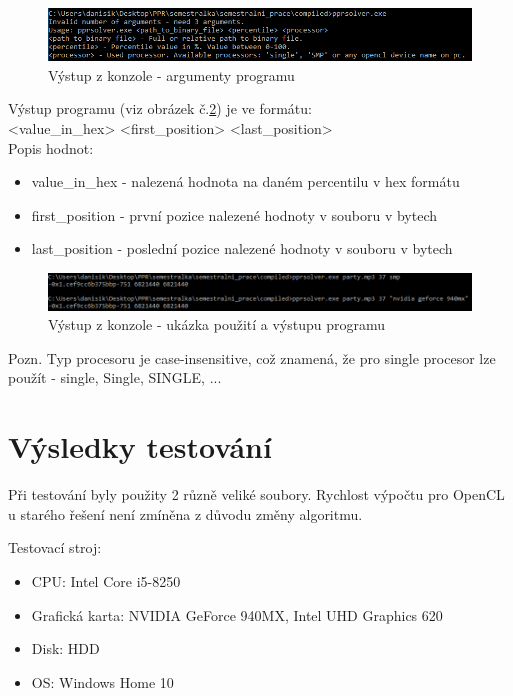 \documentclass[12pt, a4paper]{article}
\begin{document}
\begin{figure}[h!]
\centering
\includegraphics[width=16cm]{img/console_invalid}
\caption{Výstup z konzole - argumenty programu}
\label{fig:arguments}
\end{figure}

\noindent Výstup programu (viz obrázek č.\ref{fig:output}) je ve formátu:\\

\noindent <value\_in\_hex> <first\_position> <last\_position>\\

\noindent Popis hodnot:
\begin{itemize}
\item value\_in\_hex - nalezená hodnota na daném percentilu v hex formátu
\item first\_position - první pozice nalezené hodnoty v souboru v bytech
\item last\_position - poslední pozice nalezené hodnoty v souboru v bytech
\end{itemize}

\begin{figure}[h!]
\centering
\includegraphics[width=16cm]{img/console_output}
\caption{Výstup z konzole - ukázka použití a výstupu programu}
\label{fig:output}
\end{figure}

\noindent Pozn. Typ procesoru je case-insensitive, což znamená, že pro single procesor lze použít - single, Single, SINGLE, ...

\newpage
\section{Výsledky testování}
Při testování byly použity 2 různě veliké soubory. Rychlost výpočtu pro OpenCL u starého řešení není zmíněna z důvodu změny algoritmu.

\noindent Testovací stroj:
\begin{itemize}
\item CPU: Intel Core i5-8250
\item Grafická karta: NVIDIA GeForce 940MX, Intel UHD Graphics 620
\item Disk: HDD
\item OS: Windows Home 10\\
\end{itemize}
\end{document}
